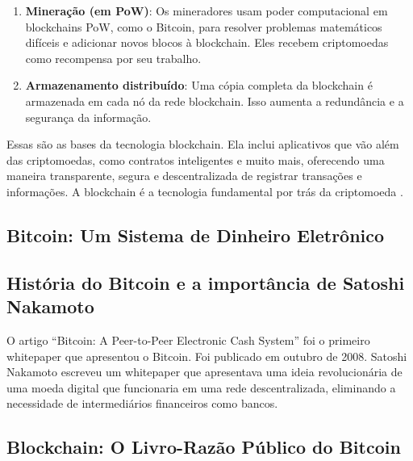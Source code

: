 \documentclass[a4paper,12pt]{article}
\begin{document}
\begin{enumerate}
     \item \textbf{Mineração (em PoW)}: Os mineradores usam poder computacional em blockchains PoW, 
     como o Bitcoin, para resolver problemas matemáticos difíceis e adicionar novos blocos à blockchain. 
     Eles recebem criptomoedas como recompensa por seu trabalho.

     \item \textbf{Armazenamento distribuído}: Uma cópia completa da blockchain é armazenada em cada nó da rede blockchain. 
     Isso aumenta a redundância e a segurança da informação.
\end{enumerate}

Essas são as bases da tecnologia blockchain. Ela inclui aplicativos que vão além das criptomoedas, como 
contratos inteligentes e muito mais, oferecendo uma maneira transparente, segura e descentralizada de registrar 
transações e informações. A blockchain é a tecnologia fundamental por trás da criptomoeda \btc. 


\subsection{Bitcoin: Um Sistema de Dinheiro Eletrônico}


\subsection{História do Bitcoin e a importância de Satoshi Nakamoto}

\hspace{0.5cm}O artigo ``Bitcoin: A Peer-to-Peer Electronic Cash System'' foi o primeiro whitepaper 
que apresentou o Bitcoin. Foi publicado em outubro de 2008. Satoshi Nakamoto escreveu um whitepaper 
que apresentava uma ideia revolucionária de uma moeda digital que funcionaria em uma rede descentralizada,
eliminando a necessidade de intermediários financeiros como bancos.

\subsection{Blockchain: O Livro-Razão Público do Bitcoin}
\end{document}
